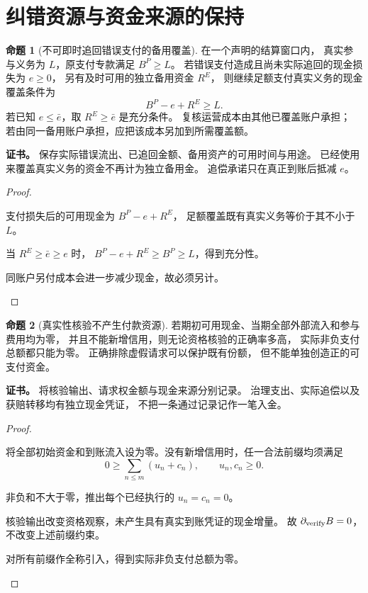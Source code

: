 \documentclass[UTF8,12pt,a4paper,openany,fontset=none,zihao=false]{ctexrep}
\theoremstyle{definition}
\newtheorem{proposition}{命题}[chapter]
\newenvironment{certificate}{\par\noindent\textbf{证书。}\ignorespaces}{\par}
\newcommand{\1}{\mathbf 1}
\begin{document}
\section{纠错资源与资金来源的保持}

\begin{proposition}[不可即时追回错误支付的备用覆盖]
\label{inc:prop-error-reserve}
在一个声明的结算窗口内，
真实参与义务为 \(L\)，原支付专款满足 \(B^P\ge L\)。
若错误支付造成且尚未实际追回的现金损失为 \(e\ge0\)，
另有及时可用的独立备用资金 \(R^E\)，
则继续足额支付真实义务的现金覆盖条件为
\[
 B^P-e+R^E\ge L.
\]
若已知 \(e\le\bar e\)，取 \(R^E\ge\bar e\) 是充分条件。
复核运营成本由其他已覆盖账户承担；
若由同一备用账户承担，应把该成本另加到所需覆盖额。
\end{proposition}
\begin{certificate}
保存实际错误流出、已追回金额、备用资产的可用时间与用途。
已经使用来覆盖真实义务的资金不再计为独立备用金。
追偿承诺只在真正到账后抵减 \(e\)。
\end{certificate}
\begin{proof}
\begin{semanticsteps}
\item 支付损失后的可用现金为 \(B^P-e+R^E\)，
足额覆盖既有真实义务等价于其不小于 \(L\)。
\item 当 \(R^E\ge\bar e\ge e\) 时，
\(B^P-e+R^E\ge B^P\ge L\)，得到充分性。
\item 同账户另付成本会进一步减少现金，故必须另计。
\end{semanticsteps}
\end{proof}

\begin{proposition}[真实性核验不产生付款资源]
\label{inc:prop-no-funds-from-verification}
若期初可用现金、当期全部外部流入和参与费用均为零，
并且不能新增信用，则无论资格核验的正确率多高，
实际非负支付总额都只能为零。
正确排除虚假请求可以保护既有份额，
但不能单独创造正的可支付资金。
\end{proposition}
\begin{certificate}
将核验输出、请求权金额与现金来源分别记录。
治理支出、实际追偿以及获赔转移均有独立现金凭证，
不把一条通过记录记作一笔入金。
\end{certificate}
\begin{proof}
\begin{semanticsteps}
\item 将全部初始资金和到账流入设为零。没有新增信用时，任一合法前缀均须满足
\[
0\ge\sum_{n\le m}(u_n+c_n),\qquad u_n,c_n\ge0.
\]
\item 非负和不大于零，推出每个已经执行的 \(u_n=c_n=0\)。
\item 核验输出改变资格观察，未产生具有真实到账凭证的现金增量。
故 \(\partial_{\rm verify}B=0\)，不改变上述前缀约束。
\item 对所有前缀作全称引入，得到实际非负支付总额为零。
\end{semanticsteps}
\end{proof}
\end{document}
